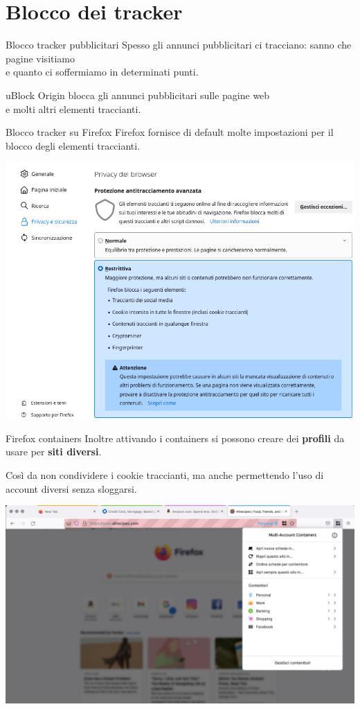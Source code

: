 
\section{Blocco dei tracker}

\begin{myframe}{Blocco tracker pubblicitari}
  Spesso gli annunci pubblicitari ci tracciano: sanno che pagine visitiamo\\ e quanto ci soffermiamo in determinati punti.

  \medskip\pause
  uBlock Origin blocca gli annunci pubblicitari sulle pagine web\\ e molti altri elementi traccianti.
\end{myframe}


\begin{myframe}{Blocco tracker su Firefox}
  Firefox fornisce di default molte impostazioni per il blocco degli elementi traccianti.

  \includegraphics[width=.7\textwidth]{img/firefox_tracker}
\end{myframe}


\begin{myframe}{Firefox containers}
  Inoltre attivando i containers si possono creare dei \textbf{profili} da usare per \textbf{siti diversi}.

  Così da non condividere i cookie traccianti, ma anche permettendo l'uso di account diversi senza sloggarsi.

  \smallskip
  \includegraphics[width=.7\textwidth]{img/firefox_containers}
\end{myframe}

